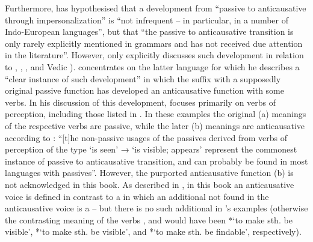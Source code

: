 Furthermore, \citet[232]{kulikov:2011b} has hypothesised that a development from “passive to anticausative through impersonalization” is “not infrequent -- in particular, in a number of Indo-European languages”, but that “the passive to anticausative transition is only rarely explicitly mentioned in grammars and has not received due attention in the literature”. However, \citet[246ff.]{kulikov:2011b} only explicitly discusses such development in relation to , , , and Vedic ). \citet[232]{kulikov:2011b} concentrates on the latter language for which he describes a “clear instance of such development” in which the suffix  with a supposedly original passive function has developed an anticausative function with some verbs. In his discussion of this development, \citeauthor{kulikov:2011b} focuses primarily on verbs of perception, including those listed in . In these examples the original (a) meanings of the respective verbs are passive, while the later (b) meanings are anticausative according to \citet[234, 249]{kulikov:2011b}: “[t]he non-passive usages of the passives derived from verbs of perception of the type ‘is seen’ → ‘is visible; appears’ represent the commonest instance of passive to anticausative transition, and can probably be found in most languages with passives”. However, the purported anticausative function (b) is not acknowledged in this book. As described in , in this book an anticausative voice is defined in contrast to a  in which an additional  not found in the anticausative voice is a  -- but there is no such additional  in \citeauthor{kulikov:2011b}’s examples (otherwise the contrasting meaning of the verbs ,  and  would have been *‘to make sth. be visible’, *‘to make sth. be visible’, and *‘to make sth. be findable’, respectively).


